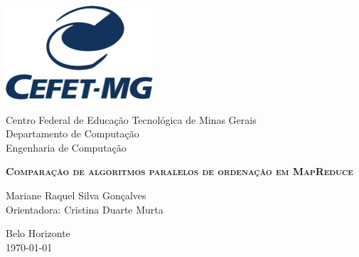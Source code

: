 

\begin{titlepage}




\begin{minipage}{0.2\textwidth}
\begin{flushleft} 
\includegraphics[scale=0.7]{figuras/logo.png} 
\end{flushleft}
\end{minipage}
\hfill
\begin{minipage}{0.7\textwidth}
\begin{flushleft}
\begin{center}
Centro Federal de Educação Tecnológica de Minas Gerais \\
Departamento de Computação \\
Engenharia de Computação
\end{center}
\end{flushleft}
\end{minipage}

\begin{center}

\vfill
\begin{Large}
\textbf{ \textsc{Comparação de algoritmos paralelos de ordenação em MapReduce}} \\[7cm]            
\end{Large}

\begin{large}
Mariane Raquel Silva Gonçalves	 \\
Orientadora: Cristina Duarte Murta \\[3cm]
\end{large}

Belo Horizonte \\ \today \\
 
\end{center}
\end{titlepage}
